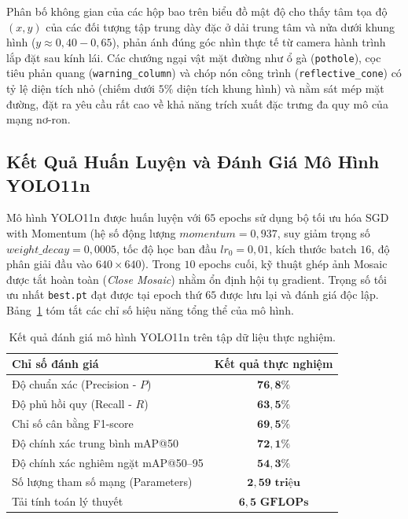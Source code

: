 \documentclass[12pt,a4paper]{article}
\begin{document}
Phân bố không gian của các hộp bao trên biểu đồ mật độ cho thấy tâm tọa độ $(x, y)$ của các đối tượng tập trung dày đặc ở dải trung tâm và nửa dưới khung hình ($y \approx 0,40 - 0,65$), phản ánh đúng góc nhìn thực tế từ camera hành trình lắp đặt sau kính lái. Các chướng ngại vật mặt đường như ổ gà (\texttt{pothole}), cọc tiêu phản quang (\texttt{warning\_column}) và chóp nón công trình (\texttt{reflective\_cone}) có tỷ lệ diện tích nhỏ (chiếm dưới $5\%$ diện tích khung hình) và nằm sát mép mặt đường, đặt ra yêu cầu rất cao về khả năng trích xuất đặc trưng đa quy mô của mạng nơ-ron.

\subsection{Kết Quả Huấn Luyện và Đánh Giá Mô Hình YOLO11n}
Mô hình YOLO11n được huấn luyện với $65$ epochs sử dụng bộ tối ưu hóa SGD with Momentum (hệ số động lượng $momentum = 0,937$, suy giảm trọng số $weight\_decay = 0,0005$, tốc độ học ban đầu $lr_0 = 0,01$, kích thước batch $16$, độ phân giải đầu vào $640 \times 640$). Trong $10$ epochs cuối, kỹ thuật ghép ảnh Mosaic được tắt hoàn toàn (\textit{Close Mosaic}) nhằm ổn định hội tụ gradient. Trọng số tối ưu nhất \texttt{best.pt} đạt được tại epoch thứ $65$ được lưu lại và đánh giá độc lập. Bảng~\ref{tab:test_metrics_overall} tóm tắt các chỉ số hiệu năng tổng thể của mô hình.

\begin{table}[htbp]
\centering
\caption{Kết quả đánh giá mô hình YOLO11n trên tập dữ liệu thực nghiệm.}
\label{tab:test_metrics_overall}
\begin{tabular}{|l|c|}
\hline
\textbf{Chỉ số đánh giá} & \textbf{Kết quả thực nghiệm} \\ \hline
Độ chuẩn xác (Precision - $P$) & $\mathbf{76,8\%}$ \\ \hline
Độ phủ hồi quy (Recall - $R$) & $\mathbf{63,5\%}$ \\ \hline
Chỉ số cân bằng F1-score & $\mathbf{69,5\%}$ \\ \hline
Độ chính xác trung bình mAP@50 & $\mathbf{72,1\%}$ \\ \hline
Độ chính xác nghiêm ngặt mAP@50--95 & $\mathbf{54,3\%}$ \\ \hline
Số lượng tham số mạng (Parameters) & $\mathbf{2,59\text{ triệu}}$ \\ \hline
Tải tính toán lý thuyết & $\mathbf{6,5\text{ GFLOPs}}$ \\ \hline
\end{tabular}
\end{table}
\end{document}
